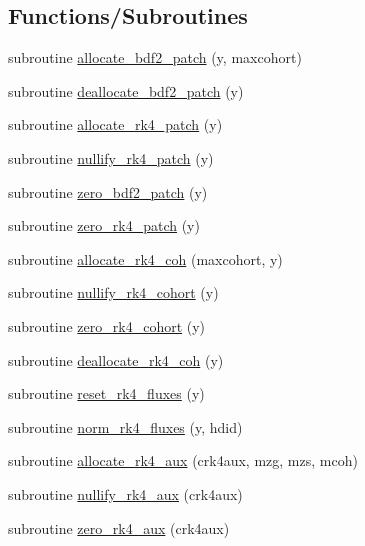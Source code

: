\subsection*{Functions/\+Subroutines}
\begin{DoxyCompactItemize}
\item 
subroutine \hyperlink{namespacerk4__coms_a292fa2f7c65668f516015eff1a3b74e2}{allocate\+\_\+bdf2\+\_\+patch} (y, maxcohort)
\item 
subroutine \hyperlink{namespacerk4__coms_a38274254cb16401c20124f7620f64ab2}{deallocate\+\_\+bdf2\+\_\+patch} (y)
\item 
subroutine \hyperlink{namespacerk4__coms_a52256ca0348235c95a467581d6067dac}{allocate\+\_\+rk4\+\_\+patch} (y)
\item 
subroutine \hyperlink{namespacerk4__coms_a34a6a346af3d032c14f416435801598a}{nullify\+\_\+rk4\+\_\+patch} (y)
\item 
subroutine \hyperlink{namespacerk4__coms_a4dc0257365f3ec4614c2e41451517e28}{zero\+\_\+bdf2\+\_\+patch} (y)
\item 
subroutine \hyperlink{namespacerk4__coms_a4206f404f555c50ee6570211356bd537}{zero\+\_\+rk4\+\_\+patch} (y)
\item 
subroutine \hyperlink{namespacerk4__coms_ac355c3cf81ffef1c269338cf8b07c4bc}{allocate\+\_\+rk4\+\_\+coh} (maxcohort, y)
\item 
subroutine \hyperlink{namespacerk4__coms_afe54efd0ad9ab38983314ca0d2557e26}{nullify\+\_\+rk4\+\_\+cohort} (y)
\item 
subroutine \hyperlink{namespacerk4__coms_a1053434edb41147cb74257d6339eab8f}{zero\+\_\+rk4\+\_\+cohort} (y)
\item 
subroutine \hyperlink{namespacerk4__coms_a56a9eb1fd462e81374c5993b69d3d05c}{deallocate\+\_\+rk4\+\_\+coh} (y)
\item 
subroutine \hyperlink{namespacerk4__coms_a02aeb5f0e99479e6eef3029472a79781}{reset\+\_\+rk4\+\_\+fluxes} (y)
\item 
subroutine \hyperlink{namespacerk4__coms_ad9cf07917e6000f8f46e84428647b494}{norm\+\_\+rk4\+\_\+fluxes} (y, hdid)
\item 
subroutine \hyperlink{namespacerk4__coms_afe1de3958c4ca4c64d5fb2160fced95f}{allocate\+\_\+rk4\+\_\+aux} (crk4aux, mzg, mzs, mcoh)
\item 
subroutine \hyperlink{namespacerk4__coms_a306ba21ba388b2e51767aa9f5d76eda0}{nullify\+\_\+rk4\+\_\+aux} (crk4aux)
\item 
subroutine \hyperlink{namespacerk4__coms_a0af8d3f6d5452c98c81c5230f3b22343}{zero\+\_\+rk4\+\_\+aux} (crk4aux)

\end{DoxyCompactItemize}
